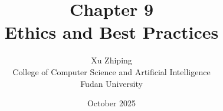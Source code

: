 \documentclass[11pt,letterpaper]{book}
\begin{document}
\title{Chapter 9\\
\large Ethics and Best Practices}
\author{Xu Zhiping\\
\small College of Computer Science and Artificial Intelligence\\
\small Fudan University}
\date{October 2025}
\maketitle

\tableofcontents

\setcounter{chapter}{8}




\printindex
\end{document}
